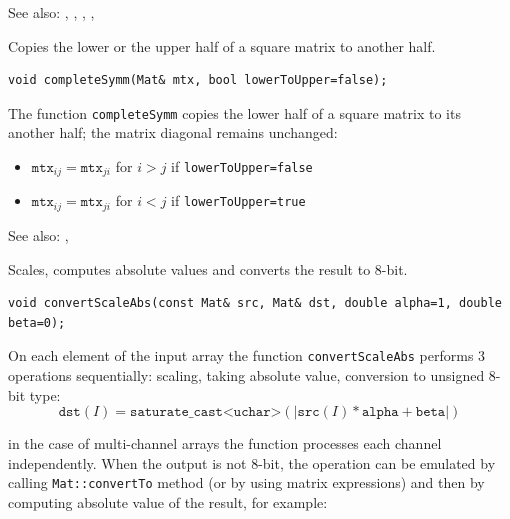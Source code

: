 See also: , , , , 

\label{completeSymm}
Copies the lower or the upper half of a square matrix to another half.

\begin{lstlisting}
void completeSymm(Mat& mtx, bool lowerToUpper=false);
\end{lstlisting}
\begin{description}
\end{description}

The function \texttt{completeSymm} copies the lower half of a square matrix to its another half; the matrix diagonal remains unchanged:

\begin{itemize}
    \item $\texttt{mtx}_{ij}=\texttt{mtx}_{ji}$ for $i > j$ if \texttt{lowerToUpper=false}
    \item $\texttt{mtx}_{ij}=\texttt{mtx}_{ji}$ for $i < j$ if \texttt{lowerToUpper=true}
\end{itemize}

See also: , 

\label{convertScaleAbs}
Scales, computes absolute values and converts the result to 8-bit.

\begin{lstlisting}
void convertScaleAbs(const Mat& src, Mat& dst, double alpha=1, double beta=0);
\end{lstlisting}
\begin{description}
\end{description}

On each element of the input array the function \texttt{convertScaleAbs} performs 3 operations sequentially: scaling, taking absolute value, conversion to unsigned 8-bit type:
\[\texttt{dst}(I)=\texttt{saturate\_cast<uchar>}(|\texttt{src}(I)*\texttt{alpha} + \texttt{beta}|)\]

in the case of multi-channel arrays the function processes each channel independently. When the output is not 8-bit, the operation can be emulated by calling \texttt{Mat::convertTo} method (or by using matrix expressions) and then by computing absolute value of the result, for example:

